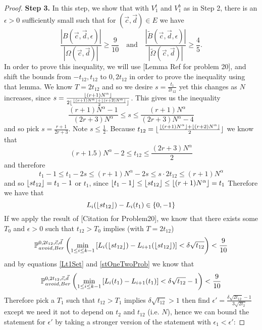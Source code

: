 \begin{proof}
	{\bf \raggedleft Step 3.} In this step, we show that with $V_1^t$ and $V_1^b$ as in Step 2, there is an $\epsilon > 0$ sufficiently small such that for $(\vec{c}, \vec{d}) \in E$ we have
	\begin{equation}\label{LemmaBP2Step3}
	\frac{|B(\vec{c}, \vec{d}, \epsilon)|}{|\Omega(\vec{c}, \vec{d})|} \geq  \frac{9}{10} \quad \mathrm{and} \quad \frac{|\tilde{B}(\vec{c}, \vec{d}, \epsilon)|}{|\tilde{\Omega}(\vec{c}, \vec{d})|} \geq  \frac{4}{5}.
	\end{equation}
	In order to prove this inequality, we will use [Lemma Ref for problem 20], and shift the bounds from $-t_{12},t_{12}$ to $0, 2t_{12}$ in order to prove the inequality using that lemma.
	We know $T=2t_{12}$ and so we desire $s=\frac{t_1}{2t_{12}}$ yet this changes as $N$ increases, since $s=\frac{\lfloor(r+1)N^\alpha\rfloor}{2\lfloor\frac{\lfloor(r+1)N^\alpha\rfloor+\lfloor(r+2)N^\alpha\rfloor}{2}\rfloor}$. This gives us the inequality \[
	\frac{(r+1)N^\alpha-1}{(2r+3)N^\alpha}\leq s\leq \frac{(r+1)N^\alpha}{(2r+3)N^\alpha-4}
	\]
	and so pick $s=\frac{r+1}{2r+3}$. Note $s\leq \frac{1}{2}$. Because $t_{12}=\lfloor\frac{\lfloor(r+1)N^\alpha\rfloor+\lfloor(r+2)N^\alpha\rfloor}{2}\rfloor$ we know that
	\[
	(r+1.5)N^\alpha-2\leq t_{12}\leq \frac{(2r+3)N^\alpha}{2}
	\]
	and therefore 
	\[
	t_1-1\leq t_1-2s\leq (r+1)N^\alpha-2s\leq s\cdot 2t_{12}\leq (r+1)N^\alpha
	\]
	and so $\lfloor st_{12}\rfloor=t_1-1$ or $t_1$, since $\lfloor t_1-1\rfloor\leq \lfloor st_{12}\rfloor\leq \lfloor(r+1)N^\alpha\rfloor=t_1$
	Therefore we have that 
	\begin{equation}\label{Lt1Set}L_i(\lfloor st_{12}\rfloor)-L_i(t_1)\in \{0,-1\}
	\end{equation} If we apply the result of [Citation for Problem20], we know that there exists some $T_0$ and $\epsilon>0$ such that $t_{12}>T_0$ implies (with $T=2t_{12}$)
	\begin{equation}\label{stOneTwoProb}
	\mathbb{P}^{0,2t_{12},\vec c, \vec d}_{avoid,Ber}\left(\min_{1\leq i\leq k-1} \left[L_i(\lfloor st_{12}\rfloor)-L_{i+1}(\lfloor st_{12}\rfloor)\right]<\delta\sqrt{t_{12}}\right)<\frac{9}{10}
	\end{equation}
	and by equations \ref{Lt1Set} and \ref{stOneTwoProb} we know that
	\[
	\mathbb{P}^{0,2t_{12},\vec c, \vec d}_{avoid,Ber}\left(\min_{1\leq i\leq k-1} \left[L_i(t_1)-L_{i+1}(t_1)\right]<\delta\sqrt{t_{12}}-1\right)<\frac{9}{10}
	\]
	Therefore pick a $T_1$ such that $t_{12}>T_1$ implies $\delta\sqrt{t_{12}}>1$ then find $\epsilon'=\frac{\delta\sqrt{2t_{12}}-1}{3\sqrt{2t_2}}$ except we need it not to depend on $t_2$ and $t_{12}$ (i.e. $N$), hence we can bound the statement for $\epsilon'$ by taking a stronger version of the statement with $\epsilon_1<\epsilon'$: 

\end{proof}
